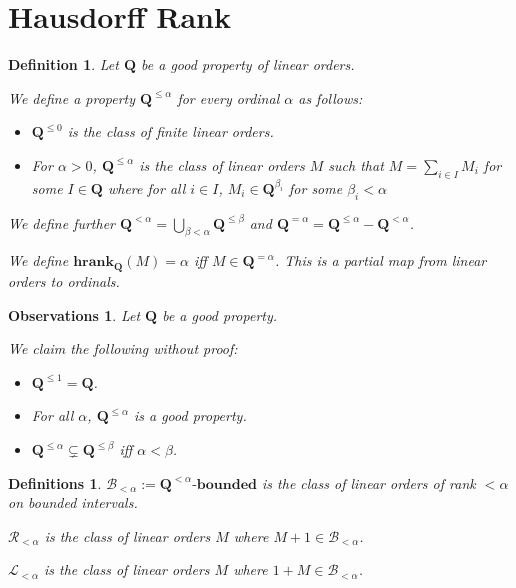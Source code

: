\documentclass{article}
\newtheorem{observations}{Observations}
\newtheorem{definition}{Definition}
\newtheorem{definitions}{Definitions}
\newcommand{\hrank}[1]{\mathbf{hrank}_{\qq}\left( #1 \right)}
\newcommand{\bounded}[1]{{#1} \text{-} \mathbf{bounded}}
\newcommand{\qq}{\mathbf{Q}}
\begin{document}
\section{Hausdorff Rank}

\begin{definition}
  Let $\qq$ be a good property of linear orders.

  We define a property $\qq^{\le \alpha}$
  for every ordinal $\alpha$ as follows:
  
  \begin{itemize}
    \item $\qq^{\le 0}$ is the class of finite linear orders.
    \item For $\alpha > 0$, $\qq^{\le \alpha}$ is the class of linear orders $M$ such that
          $M = \sum_{i \in I} M_i$ for some $I \in \qq$ where 
          for all $i \in I$, $M_i \in \qq^{\beta_i}$ for some $\beta_i < \alpha$
  \end{itemize}

  We define further $\qq^{< \alpha} = \bigcup_{\beta < \alpha} \qq^{\le \beta}$
  and $\qq^{=\alpha} = \qq^{\le \alpha} - \qq^{< \alpha}$.

  We define $\hrank{M} = \alpha$ iff $M \in \qq^{= \alpha}$.
  This is a \emph{partial map} from linear orders to ordinals.
\end{definition}

\begin{observations}
  Let $\qq$ be a good property.

  We claim the following without proof:

  \begin{itemize}
    \item $\qq^{\le 1} = \qq$.
    \item For all $\alpha$, $\qq^{\le \alpha}$ is a good property.
    \item $\qq^{\le \alpha} \subsetneq \qq^{\le \beta}$ iff $\alpha < \beta$.
  \end{itemize}
\end{observations}

\begin{definitions}
  $\mathcal{B}_{< \alpha} := \bounded{\qq^{< \alpha}}$ is the class
  of linear orders of rank $< \alpha$ on bounded intervals.

  $\mathcal{R}_{< \alpha}$ is the class
  of linear orders $M$ where $M + 1 \in \mathcal{B}_{< \alpha}$.

  $\mathcal{L}_{< \alpha}$ is the class
  of linear orders $M$ where $1 + M \in \mathcal{B}_{< \alpha}$.
\end{definitions}
\end{document}
